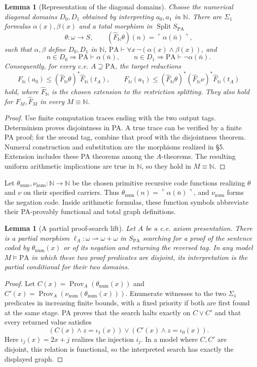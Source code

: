 \documentclass[11pt]{article}
\newtheorem{lemma}[theorem]{Lemma}
\theoremstyle{definition}\newtheorem{definition}[theorem]{Definition}
\newcommand{\PA}{\mathrm{PA}}
\newcommand{\N}{\mathbb N}
\newcommand{\Split}{\operatorname{Split}}
\newcommand{\Prov}{\operatorname{Prov}}
\begin{document}
\begin{lemma}[Representation of the diagonal domains]\label{lem:reduction}
Choose the numerical diagonal domains $D_0,D_1$ obtained by
interpreting $a_0,a_1$ in $\N$. There are $\Sigma_1$ formulas
$\alpha(x),\beta(x)$ and a total morphism in $\Split S_{\PA}$
\[
 \theta:\omega\to S,\qquad
 (\widehat F_{\N}\theta)(n)=\ulcorner\alpha(\bar n)\urcorner,
\]
such that $\alpha,\beta$ define $D_0,D_1$ in $\N$,
$\PA\vdash\forall x\,\neg(\alpha(x)\land\beta(x))$, and
\[
 n\in D_0\Rightarrow\PA\vdash\alpha(\bar n),\qquad
 n\in D_1\Rightarrow\PA\vdash\neg\alpha(\bar n).
\]
Consequently, for every c.e. $A\supseteq\PA$, the target reductions
\[
 F_{\N}(a_0)\le(\widehat F_{\N}\theta)^*\widehat F_{\N}(t_A),\qquad
 F_{\N}(a_1)\le(\widehat F_{\N}\theta)^*
                  (\widehat F_{\N}\nu)^*\widehat F_{\N}(t_A)
\]
hold, where $\widehat F_{\N}$ is the chosen extension to the
restriction splitting. They also hold for $F_M,\widehat F_M$ in
every $M\equiv\N$.
\end{lemma}
\begin{proof}
Use finite computation traces ending with the two output tags.
Determinism proves disjointness in PA. A true trace can be verified
by a finite PA proof; for the second tag, combine that proof with
the disjointness theorem. Numeral construction and substitution are
the morphisms realized in \S5. Extension includes these PA theorems
among the $A$-theorems. The resulting uniform arithmetic implications
are true in $\N$, so they hold in $M\equiv\N$.
\end{proof}

Let $\theta_{\mathrm{num}},\nu_{\mathrm{num}}:\N\to\N$ be the
chosen primitive recursive code functions realizing $\theta$ and
$\nu$ on their specified carriers. Thus
$\theta_{\mathrm{num}}(n)=\ulcorner\alpha(\bar n)\urcorner$,
and $\nu_{\mathrm{num}}$ forms the negation code. Inside arithmetic
formulas, these function symbols abbreviate their PA-provably
functional and total graph definitions.

\begin{lemma}[A partial proof-search lift]\label{lem:proof-search}
Let $A$ be a c.e. axiom presentation. There is a partial morphism
$\ell_A:\omega\rightharpoonup\omega+\omega$ in $S_{\PA}$
searching for a proof of the sentence coded by
$\theta_{\mathrm{num}}(x)$ or of its negation and returning
the reversed tag. In any model $M\models\PA$ in which these two
proof predicates are disjoint, its interpretation is the partial
conditional for their two domains.
\end{lemma}
\begin{proof}
Let $C(x)=\Prov_A(\theta_{\mathrm{num}}(x))$ and
$C'(x)=\Prov_A(\nu_{\mathrm{num}}(\theta_{\mathrm{num}}(x)))$.
Enumerate witnesses to the two
$\Sigma_1$ predicates in increasing finite bounds, with a fixed
priority if both are first found at the same stage. PA proves that
the search halts exactly on $C\lor C'$ and that every returned
value satisfies
\[
 (C(x)\land z=\iota_1(x))\lor
 (C'(x)\land z=\iota_0(x)).
\]
Here $\iota_j(x)=2x+j$ realizes the injection $i_j$.
In a model where $C,C'$ are disjoint, this relation is functional,
so the interpreted search has exactly the displayed graph.
\end{proof}
\end{document}
